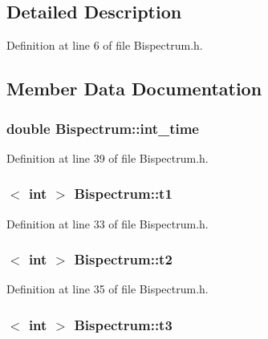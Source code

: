 \subsection{Detailed Description}


Definition at line 6 of file Bispectrum.h.



\subsection{Member Data Documentation}
\hypertarget{classBispectrum_a1f82b8ea4518fa3870102b1975282c44}{
\subsubsection[{int\_\-time}]{\setlength{\rightskip}{0pt plus 5cm}double {\bf Bispectrum::int\_\-time}}}
\label{classBispectrum_a1f82b8ea4518fa3870102b1975282c44}


Definition at line 39 of file Bispectrum.h.

\hypertarget{classBispectrum_acdc726e2151be0caed4263bfd5945d35}{
\subsubsection[{t1}]{$<$ int $>$ {\bf Bispectrum::t1}}}
\label{classBispectrum_acdc726e2151be0caed4263bfd5945d35}


Definition at line 33 of file Bispectrum.h.

\hypertarget{classBispectrum_a0fc19bc4234f4d5f5b5fff0f16a1d19a}{
\subsubsection[{t2}]{$<$ int $>$ {\bf Bispectrum::t2}}}
\label{classBispectrum_a0fc19bc4234f4d5f5b5fff0f16a1d19a}


Definition at line 35 of file Bispectrum.h.

\hypertarget{classBispectrum_a35a0c8149a0543a004044ff4ffc2eea1}{
\subsubsection[{t3}]{$<$ int $>$ {\bf Bispectrum::t3}}}
\label{classBispectrum_a35a0c8149a0543a004044ff4ffc2eea1}



